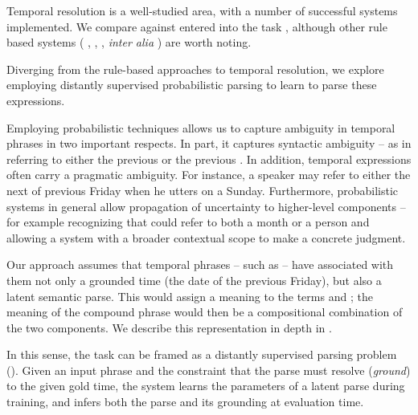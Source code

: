 
Temporal resolution is a well-studied area, with a number of successful systems
	implemented.
We compare against  \cite{key:2010strotgen-temporal}
	entered into the  task \cite{key:2010verhagen-tempeval},
	although other rule based systems (
		, 	,
		, \textit{inter alia}
	) are worth noting.

Diverging from the rule-based approaches to temporal resolution,
	we explore employing distantly supervised probabilistic parsing
	to learn to parse these expressions.

Employing probabilistic techniques allows us to capture ambiguity in temporal 
	phrases in two important respects.
In part, it captures syntactic ambiguity -- as in  referring to either the previous  or the previous
	.
In addition, temporal expressions often carry a pragmatic ambiguity.
For instance, a speaker may refer to either the next of previous Friday
	when he utters  on a Sunday.
Furthermore, probabilistic systems in general allow propagation of uncertainty
	to higher-level components -- for example recognizing that  could
	refer to both a month or a person and allowing a system with a broader
	contextual scope to make a concrete judgment.

Our approach assumes that temporal phrases -- such as  -- have
	associated with them not only a grounded time (the date of the previous
	Friday), but also a latent semantic parse.
This would assign a meaning to the terms  and ; the
	meaning of the compound phrase would then be a compositional combination
	of the two components.
We describe this representation in depth in .

In this sense, the task can be framed as a distantly supervised parsing
	problem ().
Given an input phrase and the constraint that the parse must resolve 
	(\textit{ground}) to the
	given gold time, the system learns the parameters of a latent parse during
	training, and infers both the parse and its grounding at evaluation time.


